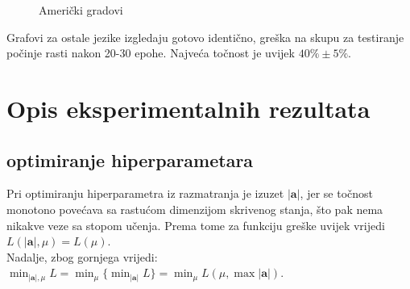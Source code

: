 \documentclass[conference]{IEEEtran}
\begin{document}
\begin{figure}[H]
\centering
{}
\caption{Američki gradovi}
\end{figure}
Grafovi za ostale jezike izgledaju gotovo identično, greška na skupu za testiranje počinje rasti nakon 20-30 epohe. Najveća točnost je uvijek $40\% \pm 5\%$.

\section{Opis eksperimentalnih rezultata} 
\subsection{optimiranje hiperparametara}
Pri optimiranju hiperparametra iz razmatranja je izuzet $\lvert \mathbf{a} \rvert$, jer se točnost monotono povećava sa rastućom dimenzijom skrivenog stanja, što pak nema nikakve veze sa stopom učenja. Prema tome za funkciju greške uvijek vrijedi $L(\lvert \mathbf{a} \rvert, \mu) = L(\mu)$.\\
Nadalje, zbog gornjega vrijedi: $\min_{\lvert \mathbf{a} \rvert, \mu} L = \min_{\mu} \{ \min_{\lvert \mathbf{a} \rvert} L \} = \min_{\mu} L(\mu, \max {\lvert \mathbf{a} \rvert})$.
\\
\end{document}
